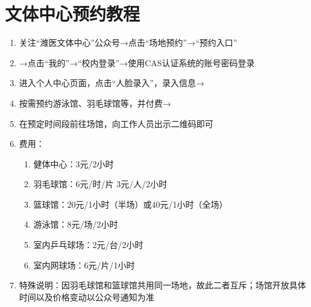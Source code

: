\section[文体中心预约教程]{文体中心预约教程}
\label{sports_center_book}
\begin{enumerate}
      \item 关注“潍医文体中心”公众号→点击“场地预约”→“预约入口”
      \item →点击“我的”→“校内登录”→使用CAS认证系统的账号密码登录
      \item 进入个人中心页面，点击“人脸录入”，录入信息→
      \item 按需预约游泳馆、羽毛球馆等，并付费→
      \item 在预定时间段\footnotemark 前往场馆，向工作人员出示二维码即可
      \item 费用：
            \begin{enumerate}
                  \item 健体中心：3元/2小时
                  \item 羽毛球馆\footnotemark：6元/时/片 3元/人/2小时
                  \item 篮球馆：20元/1小时（半场）或40元/1小时（全场）
                  \item 游泳馆\footnotemark：8元/场/2小时
                  \item 室内乒乓球场：2元/台/2小时
                  \item 室内网球场：6元/片/1小时
            \end{enumerate}
      \item 特殊说明：因羽毛球馆和篮球馆共用同一场地，故此二者互斥；场馆开放具体时间以及价格变动以公众号通知为准
\end{enumerate}
